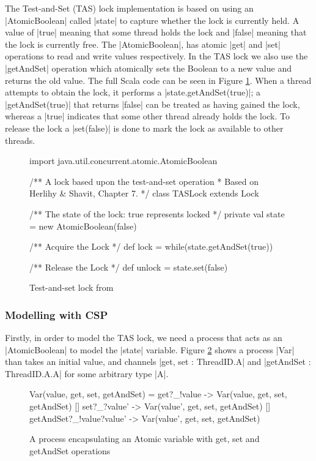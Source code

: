 The Test-and-Set (TAS) lock implementation is based on using an |AtomicBoolean| called |state| to capture whether the lock is currently held. A value of |true| meaning that some thread holds the lock and |false| meaning that the lock is currently free. The |AtomicBoolean|, has atomic |get| and |set| operations to read and write values respectively. In the TAS lock we also use the |getAndSet| operation which atomically sets the Boolean to a new value and returns the old value. The full Scala code can be seen in Figure \ref{fig:TASScala}. When a thread attempts to obtain the lock, it performs a |state.getAndSet(true)|; a |getAndSet(true)| that returns |false| can be treated as having gained the lock, whereas a |true| indicates that some other thread already holds the lock. To release the lock a |set(false)| is done to mark the lock as available to other threads.

\begin{figure}
  \begin{scala}
  import java.util.concurrent.atomic.AtomicBoolean

  /** A lock based upon the test-and-set operation 
    * Based on Herlihy & Shavit, Chapter 7. */
  class TASLock extends Lock{
    /** The state of the lock: true represents locked */
    private val state = new AtomicBoolean(false)

    /** Acquire the Lock */ 
    def lock = while(state.getAndSet(true)){ }

    /** Release the Lock */
    def unlock = state.set(false)
  }
  \end{scala}
  \caption{Test-and-set lock from \cite{CADS}  \label{fig:TASScala}}
\end{figure}

\subsubsection{Modelling with CSP}

\inlineCSP

Firstly, in order to model the TAS lock, we need a process that acts as an |AtomicBoolean| to model the |state| variable. Figure \ref{csp:Variable} shows a process |Var| than takes an initial value, and channels |get, set : ThreadID.A| and |getAndSet : ThreadID.A.A| for some arbitrary type |A|.

\begin{figure}
  \begin{cspm}
  Var(value, get, set, getAndSet) = 
    get?_!value -> Var(value, get, set, getAndSet)
    [] set?_?value' -> Var(value', get, set, getAndSet)
    [] getAndSet?_!value?value' -> Var(value', get, set, getAndSet)
  \end{cspm}
  \caption{A process encapsulating an Atomic variable with get, set and getAndSet operations}
  \label{csp:Variable}
\end{figure}

